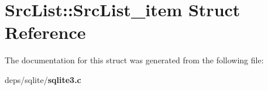 \section{Src\-List::Src\-List\_\-item Struct Reference}
\label{structSrcList_1_1SrcList__item}


The documentation for this struct was generated from the following file:\begin{CompactItemize}
\item 
deps/sqlite/\bf{sqlite3.c}\end{CompactItemize}
